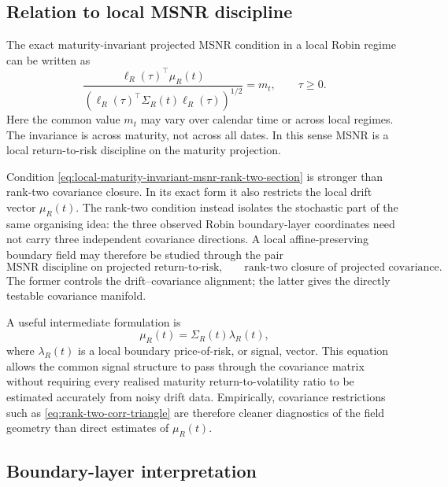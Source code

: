 \documentclass[11pt]{article}
\numberwithin{equation}{section}
\begin{document}
\subsection{Relation to local MSNR discipline}

The exact maturity-invariant projected MSNR condition in a local Robin regime can be written as
\begin{equation}
\label{eq:local-maturity-invariant-msnr-rank-two-section}
        \frac{
        \ell_R(\tau)^\top\mu_R(t)
        }{
        \left(\ell_R(\tau)^\top\Sigma_R(t)\ell_R(\tau)\right)^{1/2}
        }
        =m_t,
        \qquad \tau\geq0.
\end{equation}
Here the common value \(m_t\) may vary over calendar time or across local regimes.  The invariance is across maturity, not across all dates.  In this sense MSNR is a local return-to-risk discipline on the maturity projection.

Condition \eqref{eq:local-maturity-invariant-msnr-rank-two-section} is stronger than rank-two covariance closure.  In its exact form it also restricts the local drift vector \(\mu_R(t)\).  The rank-two condition instead isolates the stochastic part of the same organising idea: the three observed Robin boundary-layer coordinates need not carry three independent covariance directions.  A local affine-preserving boundary field may therefore be studied through the pair
\[
        \text{MSNR discipline on projected return-to-risk,}
        \qquad
        \text{rank-two closure of projected covariance.}
\]
The former controls the drift--covariance alignment; the latter gives the directly testable covariance manifold.

A useful intermediate formulation is
\begin{equation}
\label{eq:mu-sigma-lambda-rank-two-section}
        \mu_R(t)=\Sigma_R(t)\lambda_R(t),
\end{equation}
where \(\lambda_R(t)\) is a local boundary price-of-risk, or signal, vector.  This equation allows the common signal structure to pass through the covariance matrix without requiring every realised maturity return-to-volatility ratio to be estimated accurately from noisy drift data.  Empirically, covariance restrictions such as \eqref{eq:rank-two-corr-triangle} are therefore cleaner diagnostics of the field geometry than direct estimates of \(\mu_R(t)\).

\subsection{Boundary-layer interpretation}
\end{document}
